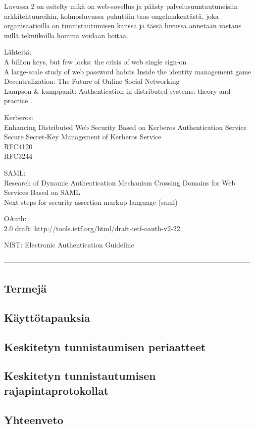 Luvussa 2 on esitelty mikä on web-sovellus ja päästy palvelusuuntautuneisiin arkkitehtuureihin, kolmosluvussa puhuttiin taas ongelmakentästä, joka organisaatioilla on tunnistautumisen kanssa ja tässä luvussa annetaan vastaus millä tekniikoilla homma voidaan hoitaa.

Lähteitä:\\
A billion keys, but few locks: the crisis of web single sign-on \cite{billion_keys}\\
A large-scale study of web password habits \cite{password_habits}
Inside the identity management game \cite{inside_the_identity_management_game}\\
Decentralization: The Future of Online Social Networking \cite{decentralisations}\\
Lampson \& kumppanit: Authentication in distributed systems: theory and practice \cite{lampson}.

Kerberos:\\
Enhancing Distributed Web Security Based on Kerberos Authentication Service \cite{enchancing_distributed_web_security}\\
Secure Secret-Key Management of Kerberos Service \cite{secure_secret_key}\\
RFC4120 \cite{rfc4120}\\
RFC3244 \cite{rfc3244}

SAML:\\
Research of Dynamic Authentication Mechanism Crossing Domains for Web Services Based on SAML \cite{dynamic_saml}\\
Next steps for security assertion markup language (saml) \cite{next_saml}

OAuth:\\
2.0 draft: http://tools.ietf.org/html/draft-ietf-oauth-v2-22 \cite{oauth2_0}

NIST: Electronic Authentication Guideline \cite{nisti}

-----------------------------------------------------------------------------------------------------------


\subsection{Termejä}

\subsection{Käyttötapauksia}

\subsection{Keskitetyn tunnistaumisen periaatteet}

\subsection{Keskitetyn tunnistautumisen rajapintaprotokollat}

\subsection{Yhteenveto}

